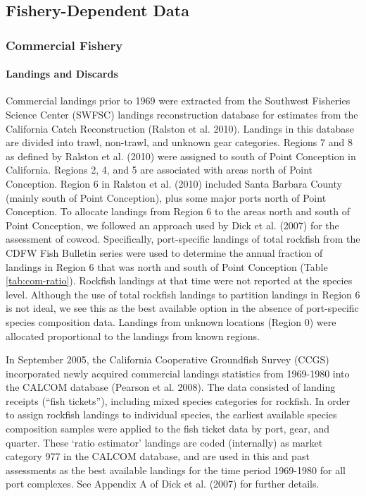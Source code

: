 \documentclass[11pt,
  english,
  letterpaper,
]{article}
\begin{document}
\hypertarget{fishery-dependent-data}{%
\subsection{Fishery-Dependent Data}\label{fishery-dependent-data}}

\hypertarget{commercial-fishery}{%
\subsubsection{Commercial Fishery}\label{commercial-fishery}}

\hypertarget{landings-and-discards}{%
\paragraph{Landings and Discards}\label{landings-and-discards}}

\hfill\break

Commercial landings prior to 1969 were extracted from the Southwest Fisheries Science Center (SWFSC) landings reconstruction database for estimates from the California Catch Reconstruction (Ralston et al. 2010). Landings in this database are divided into trawl, non-trawl, and unknown gear categories. Regions 7 and 8 as defined by Ralston et al. (2010) were assigned to south of Point Conception in California. Regions 2, 4, and 5 are associated with areas north of Point Conception. Region 6 in Ralston et al. (2010) included Santa Barbara County (mainly south of Point Conception), plus some major ports north of Point Conception. To allocate landings from Region 6 to the areas north and south of Point Conception, we followed an approach used by Dick et al. (2007) for the assessment of cowcod. Specifically, port-specific landings of total rockfish from the CDFW Fish Bulletin series were used to determine the annual fraction of landings in Region 6 that was north and south of Point Conception (Table \ref{tab:com-ratio}). Rockfish landings at that time were not reported at the species level. Although the use of total rockfish landings to partition landings in Region 6 is not ideal, we see this as the best available option in the absence of port-specific species composition data. Landings from unknown locations (Region 0) were allocated proportional to the landings from known regions.

In September 2005, the California Cooperative Groundfish Survey (CCGS) incorporated newly acquired commercial landings statistics from 1969-1980 into the CALCOM database (Pearson et al. 2008). The data consisted of landing receipts (``fish tickets''), including mixed species categories for rockfish. In order to assign rockfish landings to individual species, the earliest available species composition samples were applied to the fish ticket data by port, gear, and quarter. These `ratio estimator' landings are coded (internally) as market category 977 in the CALCOM database, and are used in this and past assessments as the best available landings for the time period 1969-1980 for all port complexes. See Appendix A of Dick et al. (2007) for further details.
\end{document}
